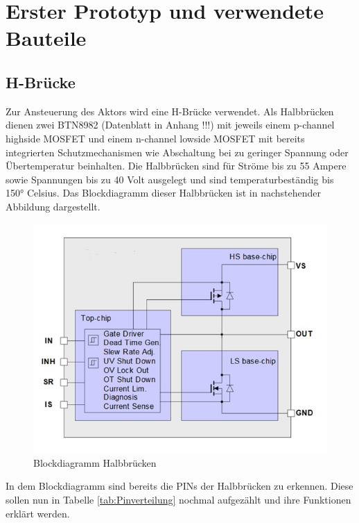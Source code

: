 \chapter{Erster Prototyp und verwendete Bauteile}
\section{H-Brücke}
Zur Ansteuerung des Aktors wird eine H-Brücke verwendet. 
Als Halbbrücken dienen zwei BTN8982 (Datenblatt in Anhang !!!) mit jeweils einem p-channel highside MOSFET und einem n-channel lowside MOSFET mit bereits integrierten Schutzmechanismen wie Abschaltung bei zu geringer Spannung oder Übertemperatur beinhalten.  Die Halbbrücken sind für Ströme bis zu 55 Ampere sowie Spannungen bis zu 40 Volt ausgelegt und sind temperaturbeständig bis 150° Celsius. Das Blockdiagramm dieser Halbbrücken ist in nachstehender Abbildung dargestellt.
\begin{figure}[h]
	\centering
		\includegraphics{Bilder/Blockdiagramm Halbbruecken.jpg}
	\caption{Blockdiagramm Halbbrücken}
	\label{fig:Blockdiagramm Halbbruecken}
\end{figure}
In dem Blockdiagramm sind bereits die PINs der Halbbrücken zu erkennen. Diese sollen nun in Tabelle \ref{tab:Pinverteilung} nochmal aufgezählt und ihre Funktionen erklärt werden. 

